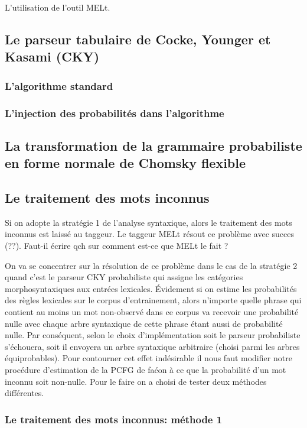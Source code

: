 \documentclass[12pt]{article}
\begin{document}
L'utilisation de l'outil MELt.

\subsection{Le parseur tabulaire de Cocke, Younger et Kasami (CKY)}

\subsubsection{L'algorithme standard}
\subsubsection{L'injection des probabilit\'es dans l'algorithme}

\subsection{La transformation de la grammaire probabiliste en forme normale de Chomsky flexible}

\subsection{Le traitement des mots inconnus}

Si on adopte la strat\'egie 1 de l'analyse syntaxique, alors le traitement des mots inconnus est laiss\'e au taggeur.
Le taggeur MELt r\'esout ce probl\`eme avec succes (??). Faut-il \'ecrire qch sur comment est-ce que MELt le fait ?

On va se concentrer sur la r\'esolution de ce probl\`eme dans le cas de la strat\'egie 2 quand c'est le parseur CKY probabiliste qui assigne les cat\'egories morphosyntaxiques aux entr\'ees lexicales. \'Evidement si on estime les probabilit\'es des r\`egles lexicales sur le corpus d'entrainement, alors n'importe quelle phrase qui contient au moins un mot non-observ\'e dans ce corpus va recevoir une probabilit\'e nulle avec chaque arbre syntaxique de cette phrase \'etant aussi de probabilit\'e nulle. Par cons\'equent, selon le choix d'impl\'ementation soit le parseur probabiliste s'\'echouera, soit il envoyera un arbre syntaxique arbitraire (choisi parmi les arbres \'equiprobables). Pour contourner cet effet ind\'esirable il nous faut modifier notre proc\'edure d'estimation de la PCFG de fa\'con \`a ce que la probabilit\'e d'un mot inconnu soit non-nulle. Pour le faire on a choisi de tester deux m\'ethodes diff\'erentes.

\subsubsection{Le traitement des mots inconnus: m\'ethode 1}
\end{document}
